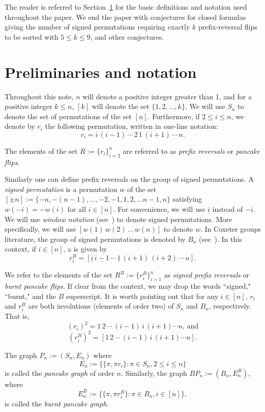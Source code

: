 \documentclass[final]{dmtcs-episciences}
\numberwithin{equation}{section}
\begin{document}
The reader is referred to Section~\ref{sec:preliminaries} for the basic definitions and notation used throughout the paper. We end the paper with conjectures for closed formulas giving the number of signed permutations requiring exactly $k$ prefix-reversal flips to be sorted with $5\leq k\leq 9$, and other conjectures.  

\section{Preliminaries and notation}\label{sec:preliminaries}
Throughout this note, $n$ will denote a positive integer greater than 1, and for a positive integer $k\leq n$, $[k]$ will denote the set $\{1,2,\ldots,k\}$. We will use $S_n$ to denote the set of permutations of the set $[n]$. Furthermore, if $2\leq i\leq n$, we denote by $r_i$ the following permutation, written in one-line notation:
\[
r_i= i\,(i-1)\,\cdots\,2\,1\,(i+1)\,\cdots\,n.
\]

The elements of the set $R:=\{r_i\}_{i=2}^n$ are referred to as \textit{prefix reversals} or \textit{pancake flips}. 

Similarly one can define prefix reversals on the group of signed permutations. A \textit{signed permutation} is a permutation $w$ of the set $[\pm n]:=\{-n,-(n-1),\ldots,-2,-1,1,2,\ldots n-1,n\}$ satisfying $w(-i)=-w(i)$ for all $i\in[n]$. For convenience, we will use $\underline{i}$ instead of $-i$. We will use \textit{window notation} (see~\cite[Section 8.1]{BjornerBrenti}) to denote signed permutations. More specifically, we will use $[w(1)\,w(2)\,\ldots\,w(n)]$ to denote $w$. In Coxeter groups literature, the group of signed permutations is denoted by $B_n$ (see~\cite[Chapter 8]{BjornerBrenti}). In this context, if $i\in [n]$, a  is given by
\[
r_i^{B}=[\underline{i}\,\underline{i-1}\,\cdots\,\underline{1}\,(i+1)\,(i+2)\,\cdots\,n].
\]

We refer to the elements of the set $R^B:=\{r_i^B\}_{i=1}^n$ as \textit{signed prefix reversals} or \textit{burnt pancake flips}. If clear from the context, we may drop the words ``signed," ``burnt," and the $B$ superscript. It is worth pointing out that for any $i\in[n]$, $r_i$ and $r_i^B$ are both involutions (elements of order two) of $S_n$ and $B_n$, respectively. That is, 
\[ \left(r_i\right)^2 = 1\, 2\, \cdots\, (i-1)\, i\, (i+1) \cdots n\text{, and}\]
\[ \left(r_i^B\right)^2 = [1\, 2\, \cdots\, (i-1)\, i\, (i+1) \cdots n]. \]

The graph $P_n:=(S_n,E_n)$ where
\[
E_n:= \{\{\pi,\pi r_i\}: \pi\in S_n,2\leq i\leq n\}
\] is called the \emph{pancake graph} of order $n$. Similarly, the graph $BP_n:=(B_n,E_n^B)$, where 
\[
E^B_n:= \{\{\pi,\pi r^B_i\}: \pi\in B_n,i\in[n]\},
\] is called the \textit{burnt pancake graph}. 
\end{document}
